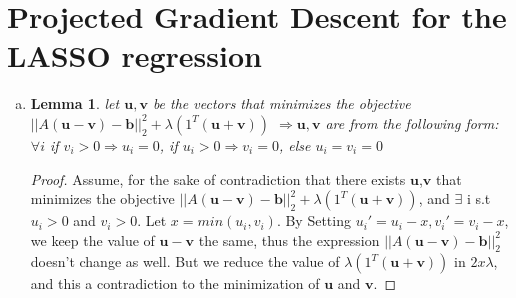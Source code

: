 \documentclass{article}
\newtheorem{lemma}{Lemma}
\begin{document}
\section{Projected Gradient Descent for the LASSO regression}
\begin{enumerate}[(a)]
\item \begin{lemma} \label{a}
let $\mathbf{u}, \mathbf{v}$ be the vectors that minimizes the objective\\ $||A(\mathbf{u} - \mathbf{v}) - \mathbf{b}||_2^2 + \lambda(1^T(\mathbf{u} + \mathbf{v}))$ $\Rightarrow \mathbf{u}, \mathbf{v}$ are from the following form:\\
$\forall i$ if $v_i > 0 \Rightarrow u_i=0$, if $u_i > 0 \Rightarrow v_i = 0$, else $u_i = v_i = 0$
\end{lemma}
\begin{proof}
Assume, for the sake of contradiction that there exists $\mathbf{u}$,$\mathbf{v}$ that minimizes the objective $||A(\mathbf{u} - \mathbf{v}) - \mathbf{b}||_2^2 + \lambda(1^T(\mathbf{u} + \mathbf{v}))$, and $\exists$ i s.t $u_i > 0$ and $v_i > 0$. Let $x=min(u_i, v_i)$. By Setting $u_i'=u_i - x, v_i'=v_i - x$, we keep the value of $\mathbf{u}-\mathbf{v}$ the same, thus the expression  $||A(\mathbf{u} - \mathbf{v}) - \mathbf{b}||_2^2$ doesn't change as well. But we reduce the value of $\lambda(1^T(\mathbf{u} + \mathbf{v}))$ in $2x\lambda$, and this a contradiction to the minimization of $\mathbf{u}$ and $\mathbf{v}$.
\end{proof}


\end{enumerate}
\end{document}
